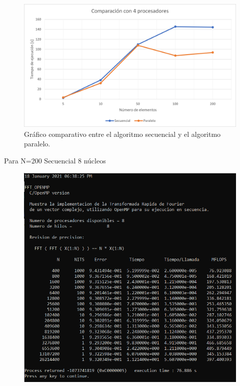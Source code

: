 \documentclass{report}
\begin{document}
\clearpage


\begin{figure}[h!]
    \centering
    \includegraphics[scale=0.9]{Images/4_Procesadores.png}
    \caption{Gráfico comparativo entre el algoritmo secuencial y el algoritmo paralelo.}
\end{figure}

\clearpage
Para N=200 Secuencial 8 núcleos\medskip

\begin{figure}[h!]
    \centering
    \includegraphics[scale=.8]{Images/FFT_Sec_200_8n.png}
    \label{Secuencial 1.6}
\end{figure}
\end{document}
